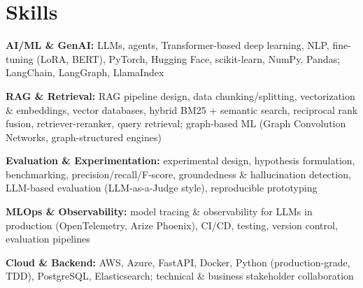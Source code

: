 \documentclass[10pt,a4paper]{article}
\begin{document}
\section{Skills}
\begin{tight}
  \item[\textcolor{accent}{\small$\bullet$}] \textbf{AI/ML \& GenAI:} LLMs, agents, Transformer-based deep learning, NLP, fine-tuning (LoRA, BERT), PyTorch, Hugging Face, scikit-learn, NumPy, Pandas; LangChain, LangGraph, LlamaIndex
  \item[\textcolor{accent}{\small$\bullet$}] \textbf{RAG \& Retrieval:} RAG pipeline design, data chunking/splitting, vectorization \& embeddings, vector databases, hybrid BM25 + semantic search, reciprocal rank fusion, retriever-reranker, query retrieval; graph-based ML (Graph Convolution Networks, graph-structured engines)
  \item[\textcolor{accent}{\small$\bullet$}] \textbf{Evaluation \& Experimentation:} experimental design, hypothesis formulation, benchmarking, precision/recall/F-score, groundedness \& hallucination detection, LLM-based evaluation (LLM-as-a-Judge style), reproducible prototyping
  \item[\textcolor{accent}{\small$\bullet$}] \textbf{MLOps \& Observability:} model tracing \& observability for LLMs in production (OpenTelemetry, Arize Phoenix), CI/CD, testing, version control, evaluation pipelines
  \item[\textcolor{accent}{\small$\bullet$}] \textbf{Cloud \& Backend:} AWS, Azure, FastAPI, Docker, Python (production-grade, TDD), PostgreSQL, Elasticsearch; technical \& business stakeholder collaboration
\end{tight}

\end{document}
